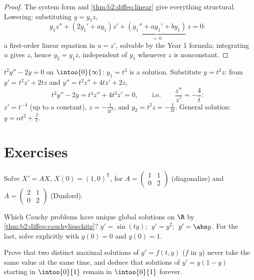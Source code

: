 \begin{proof}
The system form and \cref{thm:b2:diffeq:linear} give everything
structural. Lowering: substituting $y = y_1z$,
\[
y_1 z'' + (2y_1' + a y_1)z' + \underbrace{(y_1'' + ay_1' +
by_1)}_{=\,0}\,z = 0 :
\]
a first-order linear equation in $u = z'$, solvable by the Year 1
formula; integrating $u$ gives $z$, hence $y_2 = y_1 z$,
independent of $y_1$ whenever $z$ is nonconstant.
\end{proof}

\begin{example}\label{ex:b2:diffeq:lowering}
$t^2y'' - 2y = 0$ on $\intoo{0}{\infty}$: $y_1 = t^2$ is a
solution. Substitute $y = t^2z$: from $y' = t^2z' + 2tz$ and $y''
= t^2z'' + 4tz' + 2z$,
\[
t^2y'' - 2y = t^4 z'' + 4t^3z' = 0,
\qquad\text{i.e.}\qquad \frac{z''}{z'} = -\frac4t :
\]
$z' = t^{-4}$ (up to a constant), $z = -\frac{1}{3t^3}$, and $y_2
= t^2z = -\frac{1}{3t}$. General solution: $y = \alpha t^2 +
\frac{\beta}{t}$.
\end{example}

\section{Exercises}

\begin{exercise}[$\star$]\label{exo:b2:diffeq:1}
Solve $X' = AX$, $X(0) = (1, 0)^{\mathsf T}$, for $A =
\begin{pmatrix} 1 & 1\\ 0 & 2\end{pmatrix}$ (diagonalize) and $A =
\begin{pmatrix} 2 & 1\\ 0 & 2 \end{pmatrix}$ (Dunford).
\end{exercise}

\begin{exercise}[$\star$]\label{exo:b2:diffeq:2}
Which Cauchy problems have unique global solutions on $\R$ by
\cref{thm:b2:diffeq:cauchylipschitz}? $y' = \sin(ty)$; $\;y' =
y^2$; $\;y' = \abs y$. For the last, solve explicitly with $y(0) =
0$ and $y(0) = 1$.
\end{exercise}

\begin{exercise}[$\star$]\label{exo:b2:diffeq:3}
Prove that two distinct maximal solutions of $y' = f(t,y)$ ($f$
 in $y$) never take the same value at the same time, and
deduce that solutions of $y' = y(1 - y)$ starting in
$\intoo{0}{1}$ remain in $\intoo{0}{1}$ forever.
\end{exercise}

